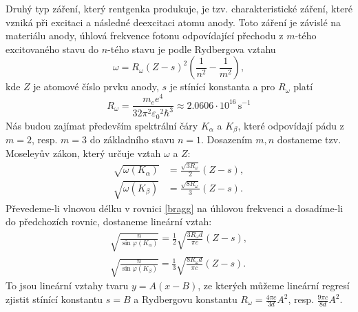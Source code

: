 \documentclass[10pt,a4paper]{article}
\renewcommand{\U}[1]{\ensuremath{\,\mathrm{#1}}}
\newcommand{\°}{\degree}
\begin{document}
Druhý typ záření, který rentgenka produkuje, je tzv. charakteristické záření, které vzniká při excitaci a následné deexcitaci atomu anody. Toto záření je závislé na materiálu anody, úhlová frekvence fotonu odpovídající přechodu z $m$-tého excitovaného stavu do $n$-tého stavu je podle Rydbergova vztahu
\begin{equation}
    \omega = R_\omega (Z - s)^2 \left( \frac{1}{n^2} - \frac{1}{m^2} \right),
\end{equation}
kde $Z$ je atomové číslo prvku anody, $s$ je stínící konstanta a pro $R_\omega$ platí
\begin{equation}
    R_\omega = \frac{m_e e^4}{32 \pi^2 {\varepsilon_0}^2 \hbar^3}
    \approx  2.0606 \cdot 10^{16} \U{s^{-1}}
\end{equation}
Nás budou zajímat především spektrální čáry $K_\alpha$ a $K_\beta$, které odpovídají pádu z $m=2$, resp. $m=3$ do základního stavu $n=1$. Dosazením $m,n$ dostaneme tzv. Moseleyův zákon, který určuje vztah $\omega$ a $Z$:
\begin{align}
    \sqrt{\omega(K_\alpha)} &= \frac{\sqrt{3R_\omega}}{2}(Z-s),
    \label{omega-k-alpha} \\
    \sqrt{\omega(K_\beta)}  &= \frac{\sqrt{8R_\omega}}{3}(Z-s).
    \label{omega-k-beta}
\end{align}
Převedeme-li vlnovou délku v rovnici \eqref{bragg} na úhlovou frekvenci a dosadíme-li do předchozích rovnic, dostaneme lineární vztah:
\begin{align}
    \sqrt{\frac{n}{\sin\varphi(K_\alpha)}}
    = \frac{1}{2}\sqrt{ \frac{3R_\omega d}{\pi c} }(Z - s),
    \label{linearni-k-alpha} \\
    \sqrt{\frac{n}{\sin\varphi(K_\beta)}}
    = \frac{1}{3}\sqrt{ \frac{8R_\omega d}{\pi c} }(Z - s).
    \label{linearni-k-beta}
\end{align}
To jsou lineární vztahy tvaru $y = A(x - B)$, ze kterých můžeme lineární regresí zjistit stínící konstantu $s=B$ a Rydbergovu konstantu $R_\omega = \tfrac{4 \pi c}{3 d} A^2$, resp. $\tfrac{9 \pi c}{8 d} A^2$.

\pagebreak
\end{document}
